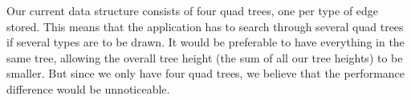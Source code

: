 Our current data structure consists of four quad trees, one per type of edge stored. This means that the application has to search through several quad trees if several types are to be drawn. It would be preferable to have everything in the same tree, allowing the overall tree height (the sum of all our tree heights) to be smaller. But since we only have four quad trees, we believe that the performance difference would be unnoticeable.